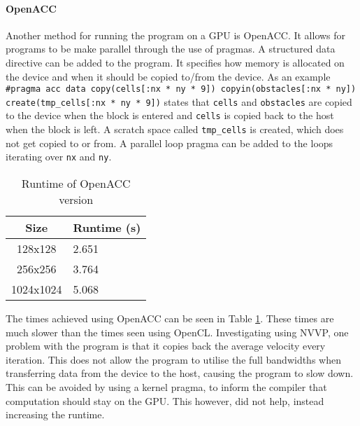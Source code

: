 

\paragraph{OpenACC}
Another method for running the program on a GPU is OpenACC. It allows for programs to be make parallel through the use of pragmas. A structured data directive can be added to the program. It specifies how memory is allocated on the device and when it should be copied to/from the device. As an example \texttt{\#pragma acc data copy(cells[:nx * ny * 9]) copyin(obstacles[:nx * ny]) create(tmp\_cells[:nx * ny * 9])} states that \texttt{cells} and \texttt{obstacles} are copied to the device when the block is entered and \texttt{cells} is copied back to the host when the block is left. A scratch space called \texttt{tmp\_cells} is created, which does not get copied to or from. A parallel loop pragma can be added to the loops iterating over \texttt{nx} and \texttt{ny}.

\begin{table}[ht]
\vspace{-5mm}
\centering
\caption{Runtime of OpenACC version}
\vspace{1mm}
\begin{tabular}{|c||p{5.8em}|}
    \hline
    Size & Runtime (s) \\
    \hline
    128x128 & 2.651 \\
    \hline
    256x256 & 3.764 \\
    \hline
    1024x1024 & 5.068 \\
    \hline
\end{tabular}
\label{table:openacc}
\vspace{-4mm}
\end{table}

The times achieved using OpenACC can be seen in Table \ref{table:openacc}. These times are much slower than the times seen using OpenCL. Investigating using NVVP, one problem with the program is that it copies back the average velocity every iteration. This does not allow the program to utilise the full bandwidths when transferring data from the device to the host, causing the program to slow down. This can be avoided by using a kernel pragma, to inform the compiler that computation should stay on the GPU. This however, did not help, instead increasing the runtime. 
